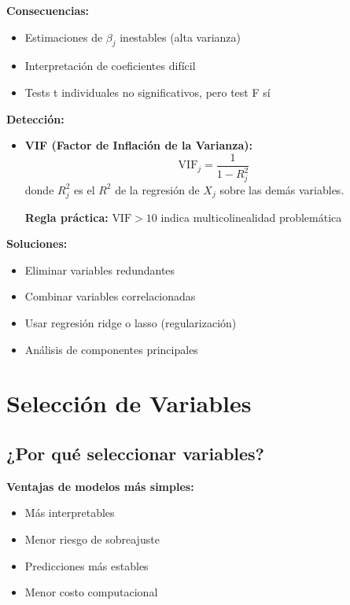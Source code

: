 \documentclass[11pt,a4paper]{article}
\begin{document}
\textbf{Consecuencias:}
\begin{itemize}
    \item Estimaciones de $\beta_j$ inestables (alta varianza)
    \item Interpretación de coeficientes difícil
    \item Tests t individuales no significativos, pero test F sí
\end{itemize}

\textbf{Detección:}
\begin{itemize}
    \item \textbf{VIF (Factor de Inflación de la Varianza):}
    \[
    \text{VIF}_j = \frac{1}{1 - R^2_j}
    \]
    donde $R^2_j$ es el $R^2$ de la regresión de $X_j$ sobre las demás variables.
    
    \textbf{Regla práctica:} $\text{VIF} > 10$ indica multicolinealidad problemática
\end{itemize}

\textbf{Soluciones:}
\begin{itemize}
    \item Eliminar variables redundantes
    \item Combinar variables correlacionadas
    \item Usar regresión ridge o lasso (regularización)
    \item Análisis de componentes principales
\end{itemize}

\section{Selección de Variables}

\subsection{¿Por qué seleccionar variables?}

\textbf{Ventajas de modelos más simples:}
\begin{itemize}
    \item Más interpretables
    \item Menor riesgo de sobreajuste
    \item Predicciones más estables
    \item Menor costo computacional
\end{itemize}
\end{document}
